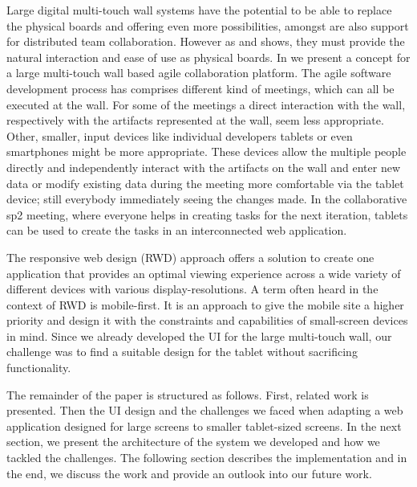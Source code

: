 \documentclass{sigchi}
\begin{document}
Large digital multi-touch wall systems have the potential to be able to replace the physical boards and offering even more possibilities, amongst are also support for distributed team collaboration. However as \cite{udcw:31721} and \cite{Mateescu:2015} shows, they must provide the natural interaction and ease of use as physical boards. 
In \cite{Mateescu:2015} we present a concept for a large multi-touch wall based agile collaboration platform. The agile software development process has comprises different kind of meetings, which can all be executed at the wall. For some of the meetings a direct interaction with the wall, respectively with the artifacts represented at the wall, seem less appropriate. Other, smaller, input devices like individual developers tablets or even smartphones might be more appropriate. These devices allow the multiple people directly and independently interact with the artifacts on the wall and enter new data or modify existing data during the meeting more comfortable via the tablet device; still everybody immediately seeing the changes made. 
In the collaborative \gls{sp2} meeting, where everyone helps in creating tasks for the next iteration, tablets can be used to create the tasks in an interconnected web application.

The responsive web design (RWD) approach offers a solution to create one application that provides an optimal viewing experience across a wide variety of different devices with various display-resolutions. 
A term often heard in the context of RWD is mobile-first. 
It is an approach to give the mobile site a higher priority and design it with the constraints and capabilities of small-screen devices in mind. 
Since we already developed the UI for the large multi-touch wall, our challenge was to find a suitable design for the tablet without sacrificing functionality.

The remainder of the paper is structured as follows.
First, related work is presented.
Then the UI design and the challenges we faced when adapting a web application designed for large screens to smaller tablet-sized screens.
In the next section, we present the architecture of the system we developed and how we tackled the challenges.
The following section describes the implementation and in the end, we discuss the work and provide an outlook into our future work.
\end{document}
